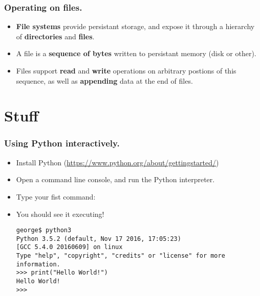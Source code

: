 \documentclass{beamer} %
\newcommand\emc[1]{\textcolor{brightblue}{\textbf{#1}}}
\begin{document}
\begin{frame}
\frametitle{Operating on files.}

\begin{itemize}
\item \emc{File systems} provide persistant storage, and expose it through a hierarchy of \emc{directories} and \emc{files}.
\item A file is a \emc{sequence of bytes} written to persistant memory (disk or other).
\item Files support \emc{read} and \emc{write} operations on arbitrary postions of this sequence, as well as \emc{appending} data at the end of files.
\end{itemize}

\end{frame}

\section{Stuff}

\begin{frame}[fragile]
\frametitle{Using Python interactively.} 

\begin{itemize}
	\item Install Python (\url{https://www.python.org/about/gettingstarted/})
	\item Open a command line console, and run the Python interpreter.
	\item Type your fist command: 
	\item You should see it executing!

\begin{Verbatim}[fontsize=\footnotesize]
george$ python3
Python 3.5.2 (default, Nov 17 2016, 17:05:23) 
[GCC 5.4.0 20160609] on linux
Type "help", "copyright", "credits" or "license" for more information.
>>> print("Hello World!")
Hello World!
>>>
\end{Verbatim}

\end{itemize}

\end{frame}




\end{document}
